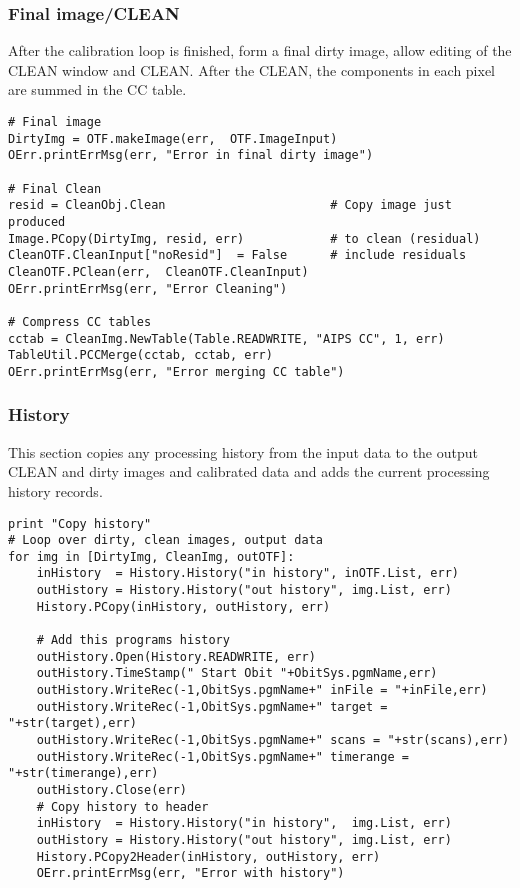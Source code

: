 \documentclass[11pt]{report}
\begin{document}
\subsubsection{Final image/CLEAN}
After the calibration loop is finished, form a final dirty image, allow
editing of the CLEAN window and CLEAN.
After the CLEAN, the components in each pixel are summed in the CC table.
\begin{verbatim}
# Final image
DirtyImg = OTF.makeImage(err,  OTF.ImageInput)
OErr.printErrMsg(err, "Error in final dirty image")

# Final Clean
resid = CleanObj.Clean                       # Copy image just produced
Image.PCopy(DirtyImg, resid, err)            # to clean (residual)        
CleanOTF.CleanInput["noResid"]  = False      # include residuals
CleanOTF.PClean(err,  CleanOTF.CleanInput)
OErr.printErrMsg(err, "Error Cleaning")

# Compress CC tables
cctab = CleanImg.NewTable(Table.READWRITE, "AIPS CC", 1, err)
TableUtil.PCCMerge(cctab, cctab, err)
OErr.printErrMsg(err, "Error merging CC table")
\end{verbatim}


\subsubsection{History}
This section copies any processing history from the input data 
to the output CLEAN and dirty images and calibrated data and adds the
current processing history records. 
\begin{verbatim}
print "Copy history"
# Loop over dirty, clean images, output data
for img in [DirtyImg, CleanImg, outOTF]:
    inHistory  = History.History("in history", inOTF.List, err)
    outHistory = History.History("out history", img.List, err)
    History.PCopy(inHistory, outHistory, err)
    
    # Add this programs history
    outHistory.Open(History.READWRITE, err)
    outHistory.TimeStamp(" Start Obit "+ObitSys.pgmName,err)
    outHistory.WriteRec(-1,ObitSys.pgmName+" inFile = "+inFile,err)
    outHistory.WriteRec(-1,ObitSys.pgmName+" target = "+str(target),err)
    outHistory.WriteRec(-1,ObitSys.pgmName+" scans = "+str(scans),err)
    outHistory.WriteRec(-1,ObitSys.pgmName+" timerange = "+str(timerange),err)
    outHistory.Close(err)
    # Copy history to header
    inHistory  = History.History("in history",  img.List, err)
    outHistory = History.History("out history", img.List, err)
    History.PCopy2Header(inHistory, outHistory, err)
    OErr.printErrMsg(err, "Error with history")

\end{verbatim}
\end{document}
